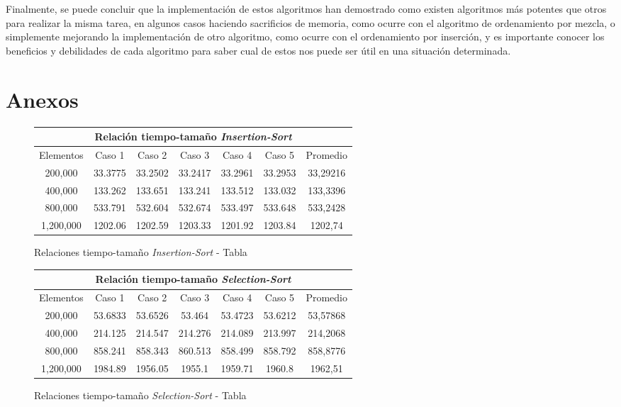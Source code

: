 \documentclass[twocolumn,english,journal]{IEEEtran}
\begin{document}
Finalmente, se puede concluir que la implementación de estos algoritmos han demostrado como existen algoritmos más potentes que otros para realizar la misma tarea, en algunos casos haciendo sacrificios de memoria, como ocurre con el algoritmo de ordenamiento por mezcla, o simplemente mejorando la implementación de otro algoritmo, como ocurre con el ordenamiento por inserción, y es importante conocer los beneficios y debilidades de cada algoritmo para saber cual de estos nos puede ser útil en una situación determinada. 
\newpage

\section{Anexos}


\begin{figure}[h]
\caption{Relaciones tiempo-tamaño  \emph{Insertion-Sort} - Tabla \label{Tabla-Insertion}}
\begin{tabular}{| c | c | c | c | c | c | c |}
\hline
\multicolumn{7}{|c|}{Relación tiempo-tamaño \emph{Insertion-Sort}} \\
\hline
\hline
Elementos & Caso 1 & Caso 2 & Caso 3 & Caso 4 & Caso 5 & Promedio \\
200,000 & 33.3775 & 33.2502 & 33.2417 & 33.2961 & 33.2953 & 33,29216\\
400,000 & 133.262 & 133.651 & 133.241 & 133.512 & 133.032 & 133,3396\\
800,000 & 533.791 & 532.604 & 532.674 & 533.497 & 533.648 & 533,2428\\
1,200,000 & 1202.06 & 1202.59 & 1203.33 & 1201.92 & 1203.84 & 1202,74\\
\hline
\end{tabular}
\end{figure}


\begin{figure}[h]
\caption{Relaciones tiempo-tamaño \emph{Selection-Sort} - Tabla \label{Tabla-Selection}}
\begin{tabular}{| c | c | c | c | c | c | c |}
\hline
\multicolumn{7}{|c|}{Relación tiempo-tamaño \emph{Selection-Sort}} \\
\hline
\hline
Elementos & Caso 1 & Caso 2 & Caso 3 & Caso 4 & Caso 5 & Promedio \\
200,000 & 53.6833 & 53.6526 & 53.464 & 53.4723 & 53.6212 & 53,57868\\
400,000 & 214.125 & 214.547 &  214.276 & 214.089 & 213.997 & 214,2068\\
800,000 & 858.241 & 858.343 & 860.513 & 858.499 & 858.792 & 858,8776\\
1,200,000 & 1984.89 & 1956.05 & 1955.1 & 1959.71 & 1960.8 & 1962,51\\
\hline
\end{tabular}
\end{figure}
\end{document}
